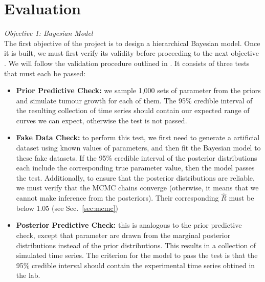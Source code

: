 \documentclass[11pt]{article}
\begin{document}
\section{Evaluation}\label{sec:eval}
\textit{Objective 1: Bayesian Model}\\[3pt]
    The first objective of the project is to design a hierarchical Bayesian model. Once it is built, we must first verify its validity before proceeding to the next objective . We will follow the validation procedure outlined in \cite{gelman2020bayesian}. It consists of three tests that must each be passed:
\begin{itemize}
    \item \textbf{Prior Predictive Check:} we sample 1,000 sets of parameter from the priors and simulate tumour growth for each of them. The 95\% credible interval of the resulting collection of time series should contain our expected range of curves we can expect, otherwise the test is not passed.
    \item \textbf{Fake Data Check:} to perform this test, we first need to generate a artificial dataset using known values of parameters, and then fit the Bayesian model to these fake datasets. If the 95\% credible interval of the posterior distributions each include the corresponding true parameter value, then the model passes the test. Additionally, to ensure that the posterior distributions are reliable, we must verify that the MCMC chains converge (otherwise, it means that we cannot make inference from the posteriors). Their corresponding $\hat{R}$ must be below 1.05 (see Sec.~\ref{sec:mcmc})
    \item \textbf{Posterior Predictive Check:} this is analogous to the prior predictive check, except that parameter are drawn from the marginal posterior distributions instead of the prior distributions. This results in a collection of simulated time series. The criterion for the model to pass the test is that the 95\% credible interval should contain the experimental time series obtined in the lab. 
\end{itemize}
\end{document}
